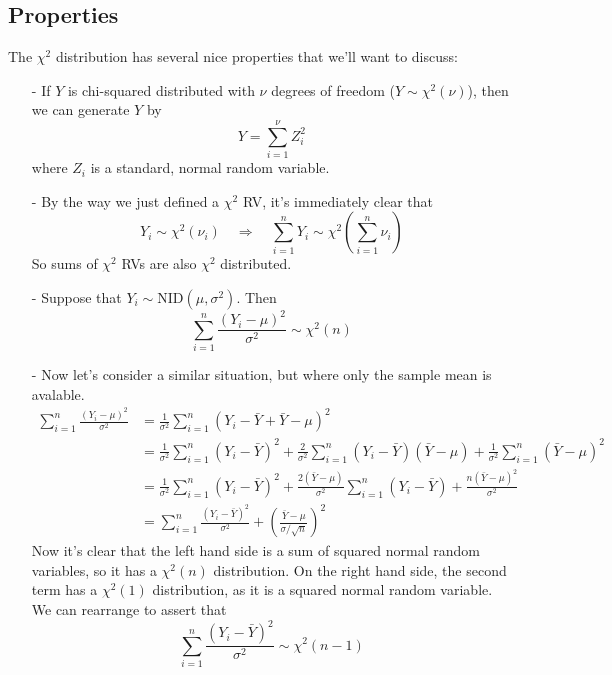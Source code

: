 \documentclass[a4paper,12pt]{scrartcl}
\begin{document}
\subsection{Properties}

The $\chi^2$ distribution has several nice properties that we'll
want to discuss:
\begin{itemize}
   \item[-] If $Y$ is chi-squared distributed with $\nu$ degrees of
      freedom ($Y\sim \chi^2(\nu)$), then we can generate $Y$ by
	 \[ Y = \sum^\nu_{i=1} Z^2_i \]
      where $Z_i$ is a standard, normal random variable.
   \item[-] By the way we just defined a $\chi^2$ RV, it's immediately
      clear that
	 \[ Y_i \sim \chi^2(\nu_i) \quad \Rightarrow \quad
	    \sum^n_{i=1} Y_i \sim \chi^2\left(\sum^n_{i=1} \nu_i \right)
	    \]
      So sums of $\chi^2$ RVs are also $\chi^2$ distributed.
   \item[-] Suppose that $Y_i \sim \text{NID}(\mu,\sigma^2)$. Then 
      \[ \sum^n_{i=1} \frac{(Y_i-\mu)^2}{\sigma^2}  \sim \chi^2(n) \]
   \item[-] Now let's consider a similar situation, but where
      only the sample mean is avalable.
      \begin{align*}
	 \sum^n_{i=1} \frac{(Y_i-\mu)^2}{\sigma^2} &= \frac{1}{
	    \sigma^2} \sum^n_{i=1} (Y_i - \bar{Y}+ \bar{Y}-\mu)^2 \\
	    &= \frac{1}{\sigma^2} \sum^n_{i=1}  (Y_i - \bar{Y})^2
	    + \frac{2}{\sigma^2} \sum^n_{i=1} (Y_i-\bar{Y})(\bar{Y}-\mu)
	    + \frac{1}{\sigma^2} \sum^n_{i=1} (\bar{Y}-\mu)^2 \\
	    &= \frac{1}{\sigma^2} \sum^n_{i=1}  (Y_i - \bar{Y})^2 
	    + \frac{2(\bar{Y}-\mu)}{\sigma^2} \sum^n_{i=1} (Y_i-\bar{Y})
	    + \frac{n(\bar{Y}-\mu)^2 }{\sigma^2}  \\
	 &= \sum^n_{i=1}\frac{(Y_i - \bar{Y})^2 }{\sigma^2} +
	    \left(\frac{\bar{Y}-\mu }{\sigma /\sqrt{n}}\right)^2
      \end{align*}
      Now it's clear that the left hand side is a sum of squared normal
      random variables, so it has a $\chi^2(n)$ distribution. On
      the right hand side, the second term has a $\chi^2(1)$
      distribution, as it is a squared normal random variable. We
      can rearrange to assert that
	 \[ \sum^n_{i=1}\frac{(Y_i - \bar{Y})^2 }{\sigma^2}  \sim
	    \chi^2(n-1) \]
\end{itemize}






\end{document}
